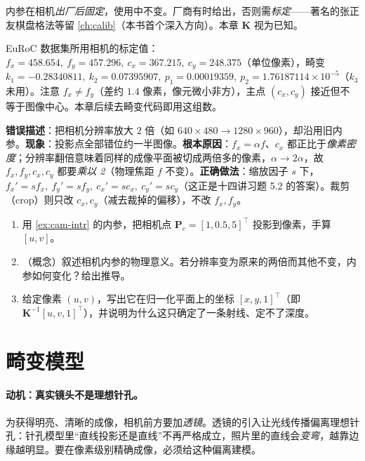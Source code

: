 \noindent 内参在相机\emph{出厂后固定}，使用中不变。厂商有时给出，否则需\emph{标定}——著名的张正友棋盘格法等留 \cref{ch:calib}（本书首个深入方向）。本章 $\mathbf{K}$ 视为已知。

\begin{example}[一组真实内参]\label{ex:cam-intr}
EuRoC 数据集所用相机的标定值\cite{gaoxiang2019slam14}：$f_x=458.654,\ f_y=457.296,\ c_x=367.215,\ c_y=248.375$（单位像素），畸变 $k_1=-0.28340811,\ k_2=0.07395907,\ p_1=0.00019359,\ p_2=1.76187114\times10^{-5}$（$k_3$ 未用）。注意 $f_x\ne f_y$（差约 $1.4$ 像素，像元微小非方），主点 $(c_x,c_y)$ 接近但不等于图像中心。本章后续去畸变代码即用这组数。
\end{example}

\begin{pitfall}
\textbf{错误描述}：把相机分辨率放大 $2$ 倍（如 $640\times480\to1280\times960$），却沿用旧内参。\textbf{现象}：投影点全部错位约一半图像。\textbf{根本原因}：$f_x=\alpha f$、$c_x$ 都正比于\emph{像素密度}；分辨率翻倍意味着同样的成像平面被切成两倍多的像素，$\alpha\to2\alpha$，故 $f_x,f_y,c_x,c_y$ 都要\emph{乘以 2}（物理焦距 $f$ 不变）。\textbf{正确做法}：缩放因子 $s$ 下，$f_x'=sf_x,\ f_y'=sf_y,\ c_x'=sc_x,\ c_y'=sc_y$（这正是十四讲习题 5.2 的答案\cite{gaoxiang2019slam14}）。裁剪（crop）则只改 $c_x,c_y$（减去裁掉的偏移），不改 $f_x,f_y$。
\end{pitfall}

\begin{practice}
\begin{enumerate}
  \item 用 \cref{ex:cam-intr} 的内参，把相机点 $\mathbf{P}_c=[1,0.5,5]^\top$ 投影到像素，手算 $[u,v]$。
  \item （概念）叙述相机内参的物理意义。若分辨率变为原来的两倍而其他不变，内参如何变化？给出推导。
  \item 给定像素 $(u,v)$，写出它在归一化平面上的坐标 $[x,y,1]^\top$（即 $\mathbf{K}^{-1}[u,v,1]^\top$），并说明为什么这只确定了一条射线、定不了深度。
\end{enumerate}
\end{practice}

\section{畸变模型}
\label{sec:cam-distortion}

\paragraph{动机：真实镜头不是理想针孔。}
为获得明亮、清晰的成像，相机前方要加\emph{透镜}\cite{gaoxiang2019slam14}。透镜的引入让光线传播偏离理想针孔：针孔模型里“直线投影还是直线”不再严格成立，照片里的直线会\emph{变弯}，越靠边缘越明显。要在像素级别精确成像，必须给这种偏离建模。

